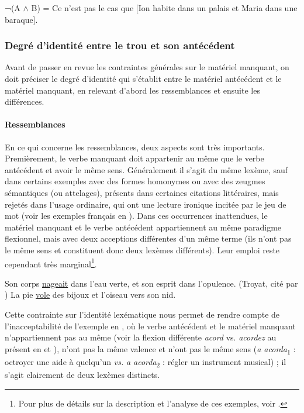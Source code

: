 \ex ¬(A $\land$ B) = Ce n’est pas le cas que [Ion habite dans un palais et Maria dans une baraque].
\z
\z


\subsubsection{Degré d’identité entre le trou et son antécédent}

Avant de passer en revue les contraintes générales sur le matériel manquant, on doit préciser le degré d’identité qui s’établit entre le matériel antécédent et le matériel manquant, en relevant d’abord les ressemblances et ensuite les différences. 

\paragraph{Ressemblances}

En ce qui concerne les ressemblances, deux aspects sont très importants. Premièrement, le verbe manquant doit appartenir au même  que le verbe antécédent et avoir le même sens. Généralement il s’agit du même lexème, sauf dans certains exemples avec des formes homonymes ou avec des zeugmes sémantiques (ou attelages), présents dans certaines citations littéraires, mais rejetés dans l’usage ordinaire, qui ont une lecture ironique incitée par le jeu de mot (voir les exemples français en ). Dans ces occurrences inattendues, le matériel manquant et le verbe antécédent appartiennent au même paradigme flexionnel, mais avec deux acceptions différentes d’un même terme (ils n’ont pas le même sens et constituent donc deux lexèmes différents). Leur emploi reste cependant très marginal\footnote{
 Pour plus de détails sur la description et l’analyse de ces exemples, voir \citet{Clement2010}.}. 

\ea \label{ch2:ex93}
\ea Son corps \uline{nageait} dans l’eau verte, et son esprit dans l’opulence. (Troyat, cité par \citealt[233]{Clement2010})  
\ex La pie \uline{vole} des bijoux et l’oiseau vers son nid.
\z
\z

Cette contrainte sur l’identité lexématique nous permet de rendre compte de l’inacceptabilité de l’exemple en , où le verbe antécédent et le matériel manquant n’appartiennent pas au même  (voir la flexion différente \textit{acord} vs. \textit{acordez} au présent en  et ), n’ont pas la même valence et n’ont pas le même sens (\textit{a acorda}\textsubscript{1} : octroyer une aide à quelqu’un \textit{vs.} \textit{a acorda}\textsubscript{2} : régler un instrument musical) ; il s’agit clairement de deux lexèmes distincts.


